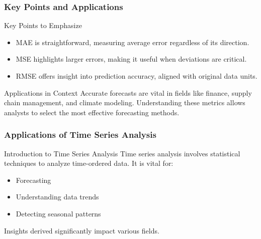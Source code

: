 \documentclass[aspectratio=169]{beamer}
\begin{document}
\begin{frame}[fragile]
    \frametitle{Key Points and Applications}
    \begin{block}{Key Points to Emphasize}
        \begin{itemize}
            \item MAE is straightforward, measuring average error regardless of its direction.
            \item MSE highlights larger errors, making it useful when deviations are critical.
            \item RMSE offers insight into prediction accuracy, aligned with original data units.
        \end{itemize}
    \end{block}
    \begin{block}{Applications in Context}
        Accurate forecasts are vital in fields like finance, supply chain management, and climate modeling. Understanding these metrics allows analysts to select the most effective forecasting methods.
    \end{block}
\end{frame}

\begin{frame}[fragile]
    \frametitle{Applications of Time Series Analysis}
    \begin{block}{Introduction to Time Series Analysis}
    Time series analysis involves statistical techniques to analyze time-ordered data. It is vital for:
    \begin{itemize}
        \item Forecasting
        \item Understanding data trends
        \item Detecting seasonal patterns
    \end{itemize}
    Insights derived significantly impact various fields.
    \end{block}
\end{frame}
\end{document}
